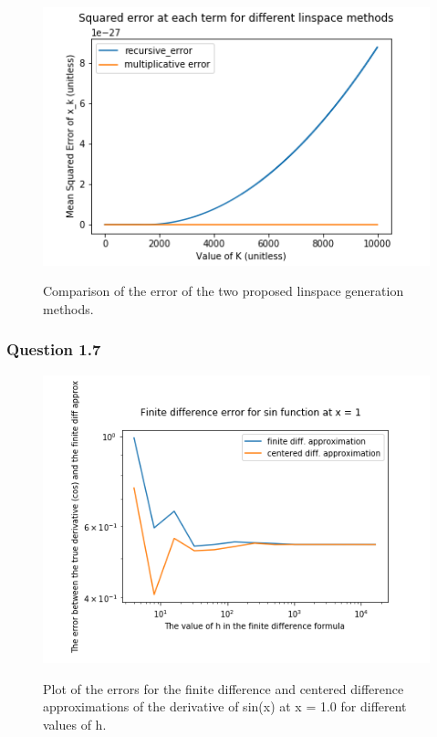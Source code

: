 \documentclass{article}
\begin{document}
\begin{figure}[H]
	\includegraphics[width=\textwidth]{fig_ch1_cp1_6.png}
	\label{fig:ch1_cp1_6}
	\caption{Comparison of the error of the two proposed linspace generation 
	methods.}
\end{figure}

\subsubsection{Question 1.7}

\begin{figure}[H]
	\includegraphics[width=\textwidth]{finite_diff_error_plot.png}
	\label{fig:ch1cp17}
	\caption{Plot of the errors for the finite difference and centered
	 difference approximations of the derivative of sin(x) at x = 1.0
	  for different values of h.}
\end{figure}
\end{document}
